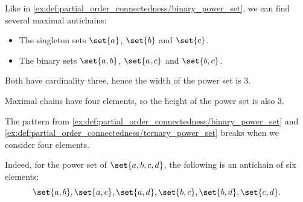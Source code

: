 \begin{example}
\begin{thmenum}
    Like in \cref{ex:def:partial_order_connectedness/binary_power_set}, we can find several maximal antichains:
    \begin{itemize}
      \item The singleton sets \( \set{ a } \), \( \set{ b } \) and \( \set{ c } \).
      \item The binary sets \( \set{ a, b } \), \( \set{ a, c } \) and \( \set{ b, c } \).
    \end{itemize}

    Both have cardinality three, hence the width of the power set is \( 3 \).

    Maximal chains have four elements, so the height of the power set is also \( 3 \).

     The pattern from \cref{ex:def:partial_order_connectedness/binary_power_set} and \cref{ex:def:partial_order_connectedness/ternary_power_set} breaks when we consider four elements.

    Indeed, for the power set of \( \set{ a, b, c, d } \), the following is an antichain of six elements:
    \begin{equation}\label{eq:ex:def:partial_order_connectedness/quad_power_set/antichain}
      \set{ a, b }, \set{ a, c }, \set{ a, d }, \set{ b, c }, \set{ b, d }, \set{ c, d }.
    \end{equation}
  \end{thmenum}
\end{example}

